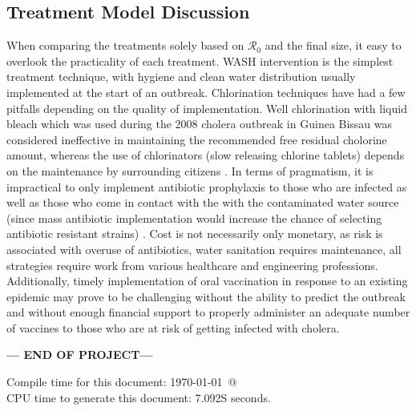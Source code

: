 \documentclass[12pt]{article}\usepackage[]{graphicx}\usepackage[]{color}
\begin{document}

\subsection{Treatment Model Discussion}
When comparing the treatments solely based on $\mathcal R_0$ and the final size, it easy to overlook the practicality of each treatment.
WASH intervention is the simplest treatment technique, with hygiene and clean water distribution usually implemented at the start of an outbreak.
Chlorination techniques have had a few pitfalls depending on the quality of implementation.
Well chlorination with liquid bleach which was used during the 2008 cholera outbreak in Guinea Bissau was considered ineffective in maintaining the recommended free residual cholorine amount, whereas the use of chlorinators (slow releasing chlorine tablets) depends on the maintenance by surrounding citizens \citep{link26}.
In terms of pragmatism, it is impractical to only implement antibiotic prophylaxis to those who are infected as well as those who come in contact with the with the contaminated water source (since mass antibiotic implementation would increase the chance of selecting antibiotic resistant strains) \citep{link23}.
Cost is not necessarily only monetary, as risk is associated with overuse of antibiotics, water sanitation requires maintenance, all strategies require work from various healthcare and engineering professions.
Additionally, timely implementation of oral vaccination in response to an existing epidemic may prove to be challenging without the ability to predict the outbreak and without enough financial support to properly administer an adequate number of vaccines to those who are at risk of getting infected with cholera.

\bigskip\vfill
\centerline{\bf--- END OF PROJECT---}
\bigskip
Compile time for this document:
\today\ @ \thistime\\
CPU time to generate this document: 7.092S seconds.
\printbibliography
\end{document}

